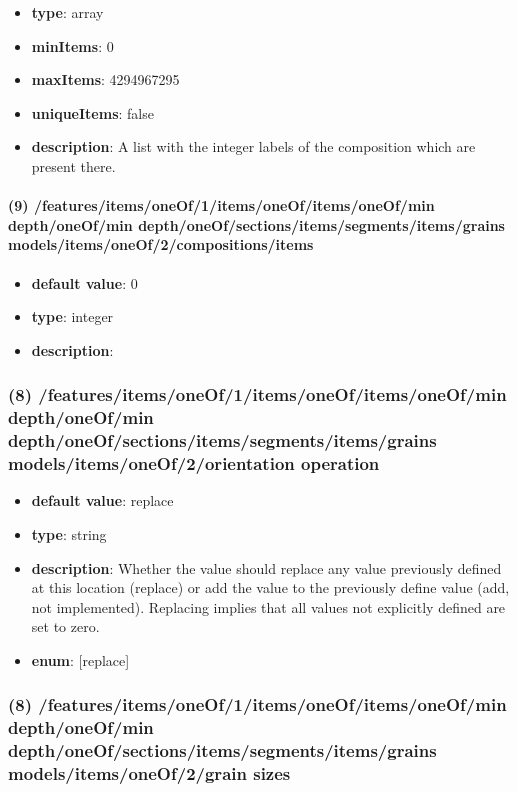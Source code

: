 \begin{itemize}[leftmargin=8em]\item {\bf type}: array
\item {\bf minItems}: 0
\item {\bf maxItems}: 4294967295
\item {\bf uniqueItems}: false
\item {\bf description}: A list with the integer labels of the composition which are present there.
\end{itemize}\paragraph{(9) /features/items/oneOf/1/items/oneOf/items/oneOf/min depth/oneOf/min depth/oneOf/sections/items/segments/items/grains models/items/oneOf/2/compositions/items}
\begin{itemize}[leftmargin=9em]\item {\bf default value}: 0
\item {\bf type}: integer
\item {\bf description}: 
\end{itemize}\subsubsection{(8) /features/items/oneOf/1/items/oneOf/items/oneOf/min depth/oneOf/min depth/oneOf/sections/items/segments/items/grains models/items/oneOf/2/orientation operation}
\begin{itemize}[leftmargin=8em]\item {\bf default value}: replace
\item {\bf type}: string
\item {\bf description}: Whether the value should replace any value previously defined at this location (replace) or add the value to the previously define value (add, not implemented). Replacing implies that all values not explicitly defined are set to zero.
\item {\bf enum}: [replace]\end{itemize}\subsubsection{(8) /features/items/oneOf/1/items/oneOf/items/oneOf/min depth/oneOf/min depth/oneOf/sections/items/segments/items/grains models/items/oneOf/2/grain sizes}
